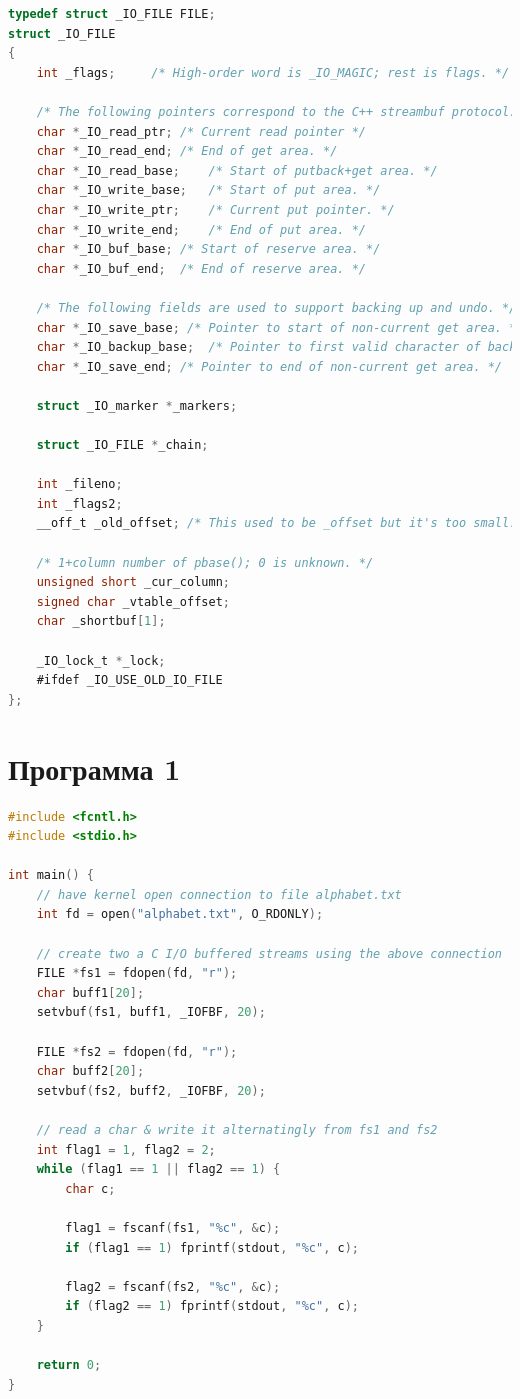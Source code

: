 \documentclass[12pt]{report}
\begin{document}
\begin{lstlisting}[label=first,caption=Структура FILE, language=C]
typedef struct _IO_FILE FILE;
struct _IO_FILE
{
	int _flags;		/* High-order word is _IO_MAGIC; rest is flags. */
	
	/* The following pointers correspond to the C++ streambuf protocol. */
	char *_IO_read_ptr;	/* Current read pointer */
	char *_IO_read_end;	/* End of get area. */
	char *_IO_read_base;	/* Start of putback+get area. */
	char *_IO_write_base;	/* Start of put area. */
	char *_IO_write_ptr;	/* Current put pointer. */
	char *_IO_write_end;	/* End of put area. */
	char *_IO_buf_base;	/* Start of reserve area. */
	char *_IO_buf_end;	/* End of reserve area. */
	
	/* The following fields are used to support backing up and undo. */
	char *_IO_save_base; /* Pointer to start of non-current get area. */
	char *_IO_backup_base;  /* Pointer to first valid character of backup area */
	char *_IO_save_end; /* Pointer to end of non-current get area. */
	
	struct _IO_marker *_markers;
	
	struct _IO_FILE *_chain;
	
	int _fileno;
	int _flags2;
	__off_t _old_offset; /* This used to be _offset but it's too small.  */
	
	/* 1+column number of pbase(); 0 is unknown. */
	unsigned short _cur_column;
	signed char _vtable_offset;
	char _shortbuf[1];
	
	_IO_lock_t *_lock;
	#ifdef _IO_USE_OLD_IO_FILE
};
\end{lstlisting}

\section*{Программа 1}

\begin{lstlisting}[label=first,caption=Программа 1, language=C]
#include <fcntl.h>
#include <stdio.h>

int main() {
	// have kernel open connection to file alphabet.txt
	int fd = open("alphabet.txt", O_RDONLY);
	
	// create two a C I/O buffered streams using the above connection
	FILE *fs1 = fdopen(fd, "r");
	char buff1[20];
	setvbuf(fs1, buff1, _IOFBF, 20);
	
	FILE *fs2 = fdopen(fd, "r");
	char buff2[20];
	setvbuf(fs2, buff2, _IOFBF, 20);
	
	// read a char & write it alternatingly from fs1 and fs2
	int flag1 = 1, flag2 = 2;
	while (flag1 == 1 || flag2 == 1) {
		char c;
		
		flag1 = fscanf(fs1, "%c", &c);
		if (flag1 == 1) fprintf(stdout, "%c", c);
		
		flag2 = fscanf(fs2, "%c", &c);
		if (flag2 == 1) fprintf(stdout, "%c", c);
	}
	
	return 0;
}
\end{lstlisting}
\end{document}
